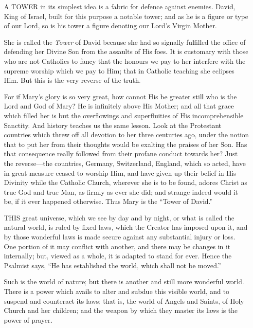 

A TOWER
in its simplest idea is a fabric for defence against enemies. David,
King of Israel, built for this purpose a notable tower; and as he is a
figure or type of our Lord, so is his tower a figure denoting our Lord's
Virgin Mother.

She is called the \emph{Tower}
of David because she had so signally fulfilled the office of defending
her Divine Son from the assaults of His foes. It is customary with those
who are not Catholics to fancy that the honours we pay to her interfere
with the supreme worship which we pay to Him; that in Catholic teaching
she eclipses Him. But this is the very reverse of the truth.

For if Mary's glory is so very
great, how cannot His be greater still who is the Lord and God of Mary?
He is infinitely above His Mother; and all that grace which filled her
is but the overflowings and superfluities of His incomprehensible
Sanctity. And history teaches us the same lesson. Look at the
Protestant countries which threw off all devotion to her three centuries
ago, under the notion that to put her from their thoughts would be
exalting the praises of her Son. Has that consequence really followed
from their profane conduct towards her? Just the reverse—the
countries, Germany, Switzerland, England, which so acted, have in great
measure ceased to worship Him, and have given up their belief in His
Divinity while the Catholic Church, wherever she is to be found, adores
Christ as true God and true Man, as firmly as ever she did; and strange
indeed would it be, if it ever happened otherwise. Thus Mary is the ``Tower
of David.''



THIS
great universe, which we see by day and by night, or what is called the
natural world, is ruled by fixed laws, which the Creator has imposed
upon it, and by those wonderful laws is made secure against any
substantial injury or loss. One portion of it may conflict with another,
and there may be changes in it internally; but, viewed as a whole, it is
adapted to stand for ever. Hence the Psalmist says, ``He has established
the world, which shall not be moved.''

Such is the world of nature; but
there is another and still more wonderful world. There is a power which
avails to alter and subdue this visible world, and to suspend and
counteract its laws; that is, the world of Angels and Saints, of Holy
Church and her children; and the weapon by which they master its laws is
the power of prayer.

